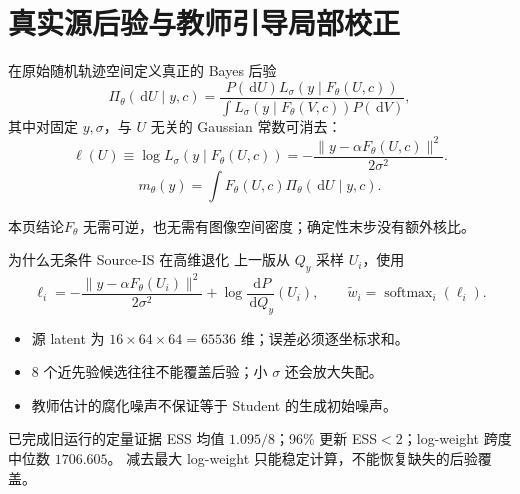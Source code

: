 \documentclass[10pt,aspectratio=169]{beamer}
\newcommand{\dd}{\,\mathrm d}
\newcommand{\takeaway}[1]{\begin{exampleblock}{本页结论}\small #1\end{exampleblock}}
\begin{document}
\section{真实源后验与教师引导局部校正}
\begin{frame}{在原始随机轨迹空间定义真正的 Bayes 后验}
\small
\begin{equation}\label{eq:posterior}
\Pi_\theta(\dd U\mid y,c)
=\frac{P(\dd U)L_\sigma(y\mid F_\theta(U,c))}
{\int L_\sigma(y\mid F_\theta(V,c))P(\dd V)},
\end{equation}
其中对固定 $y,\sigma$，与 $U$ 无关的 Gaussian 常数可消去：
\begin{equation}\label{eq:likelihood}
\ell(U)\equiv\log L_\sigma(y\mid F_\theta(U,c))
=-\frac{\|y-\alpha F_\theta(U,c)\|^2}{2\sigma^2}.
\end{equation}
\begin{equation}\label{eq:true-mean}
m_\theta(y)=\int F_\theta(U,c)\Pi_\theta(\dd U\mid y,c).
\end{equation}
\takeaway{$F_\theta$ 无需可逆，也无需有图像空间密度；确定性末步没有额外核比。}
\end{frame}

\begin{frame}{为什么无条件 Source-IS 在高维退化}
\small
上一版从 $Q_y$ 采样 $U_i$，使用
\begin{equation}
\ell_i=-\frac{\|y-\alpha F_\theta(U_i)\|^2}{2\sigma^2}
+\log\frac{\dd P}{\dd Q_y}(U_i),\qquad
\widetilde w_i=\operatorname{softmax}_i(\ell_i).
\end{equation}
\begin{itemize}\itemsep3pt
\item 源 latent 为 $16\times64\times64=65536$ 维；误差必须逐坐标求和。
\item 8 个近先验候选往往不能覆盖后验；小 $\sigma$ 还会放大失配。
\item 教师估计的腐化噪声不保证等于 Student 的生成初始噪声。
\end{itemize}
\begin{alertblock}{已完成旧运行的定量证据}
ESS 均值 $1.095/8$；96\% 更新 ESS$<2$；log-weight 跨度中位数 $1706.605$。
减去最大 log-weight 只能稳定计算，不能恢复缺失的后验覆盖。
\end{alertblock}
\end{frame}
\end{document}
